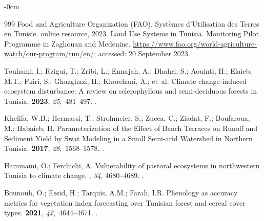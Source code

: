 \documentclass[land,article,accept,pdftex,moreauthors]{Definitions/mdpi}
\begin{document}
\begin{adjustwidth}{-\extralength}{0cm}
\begin{thebibliography}{999}
{Food and Agriculture Organization (FAO)}.
  Systèmes d'Utilisation des Terres en Tunisie.
  online resource, 2023.
  Land Use Systems in Tunisia. Monitoring Pilot Programme in Zaghouan
  and Medenine. %
  \newblock  %
  {\url{https://www.fao.org/world-agriculture-watch/our-program/tun/en/}}; accessed: 20 September 2023.

Touhami, I.; Rzigui, T.; Zribi, L.; Ennajah, A.; Dhahri, S.; Aouinti, H.;
  Elaieb, M.T.; Fkiri, S.; Ghazghazi, H.; Khorchani, A.;  et~al.
\newblock Climate change-induced ecosystem disturbance: A review on
  sclerophyllous and semi-deciduous forests in Tunisia.
 {\bf 2023}, {\em 25},~481--497.
.

Khelifa, W.B.; Hermassi, T.; Strohmeier, S.; Zucca, C.; Ziadat, F.; Boufaroua,
  M.; Habaieb, H.
\newblock Parameterization of the Effect of Bench Terraces on Runoff and
  Sediment Yield by Swat Modeling in a Small Semi-arid Watershed in Northern
  Tunisia.
 {\bf 2017}, {\em
  28},~1568--1578.
.

Hammami, O.; Ferchichi, A.
\newblock Vulnerability of pastoral ecosystems in northwestern Tunisia to
  climate change.
, {\em 34}, 4680--4689. %
.

Bounouh, O.; Essid, H.; Tarquis, A.M.; Farah, I.R.
\newblock Phenology as accuracy metrics for vegetation index forecasting over
  Tunisian forest and cereal cover types.
 {\bf 2021}, {\em
  42},~4644--4671.
.


\end{thebibliography}
\end{adjustwidth}
\end{document}

